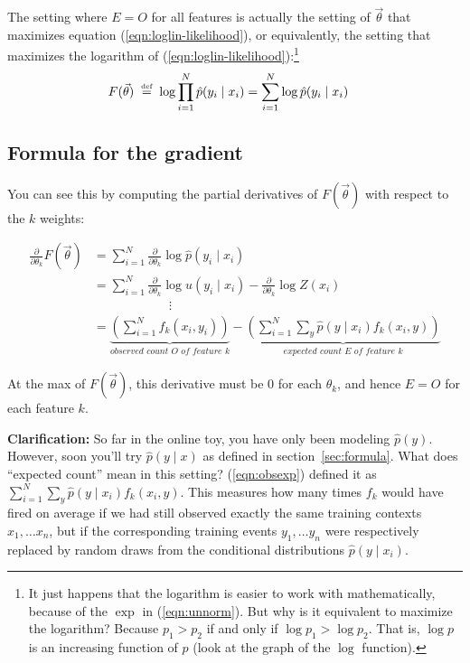 \documentclass[11pt]{article}
\newcommand{\defeq}{\;\stackrel{\mbox{\tiny def}}{=}\;}
\newcommand{\vtheta}{\vec{\theta}}
\newcommand{\ph}{\hat{p}}
\newcommand{\diffk}{\frac{\partial}{\partial \theta_k}}
\begin{document}
The setting where $E=O$ for all features is actually the
setting of $\vtheta$ that maximizes equation
(\ref{eqn:loglin-likelihood}), or equivalently, the setting that
maximizes the logarithm of (\ref{eqn:loglin-likelihood}):\footnote{It
  just happens that the logarithm is easier to work with
  mathematically, because of the $\exp$ in (\ref{eqn:unnorm}).  But
  why is it equivalent to maximize the logarithm?  Because $p_1 > p_2$
  if and only if $\log p_1 > \log p_2$.  That is, $\log p$ is
  an increasing function of $p$ (look at the graph of the $\log$ function).%
}
\begin{align}
  F(\vtheta) & \defeq \log \prod_{i=1}^N \ph(y_i \mid x_i) = \sum_{i=1}^N \log \ph(y_i \mid x_i) 
\label{eqn:loglin-log-likelihood}
\end{align}

\subsection{Formula for the gradient}

You can see this by computing the partial derivatives of $F(\vtheta)$ 
with respect to the $k$ weights:

\begin{align}
  \diffk F(\vtheta) 
  &= \sum_{i=1}^N \diffk \log \ph(y_i \mid x_i)  \\ %
  &= \sum_{i=1}^N \diffk \log u(y_i \mid x_i) - \diffk \log Z(x_i) \\
  & \hspace{1in}\vdots \nonumber \\ 
  &= \underbrace{\left( \sum_{i=1}^N f_k(x_i,y_i) \right)}_{\textit{observed count $O$ of feature $k$}}
  - \underbrace{\left( \sum_{i=1}^N \sum_y \ph(y\mid x_i) f_k(x_i,y) \right)}_{\textit{expected count $E$ of feature $k$}} \label{eqn:obsexp}
\end{align}

At the max of $F(\vtheta)$, this derivative must be 0 for each
$\theta_k$, and hence $E=O$ for each feature $k$.  

{\bf Clarification:} So far in the online toy, you have only been
modeling $\ph(y)$.  However, soon you'll try $\ph(y\mid x)$ as
defined in section~\ref{sec:formula}.  What does ``expected count'' mean in this
setting?  (\ref{eqn:obsexp}) defined it as $\sum_{i=1}^N \sum_y
\ph(y\mid x_i) f_k(x_i,y)$.  This measures how many times $f_k$ would
have fired on average if we had still observed exactly the same
training contexts $x_1,\ldots x_n$, but if the corresponding training events
$y_1,\ldots y_n$ were respectively replaced by random draws from the
conditional distributions $\ph(y \mid x_i)$.
\end{document}
